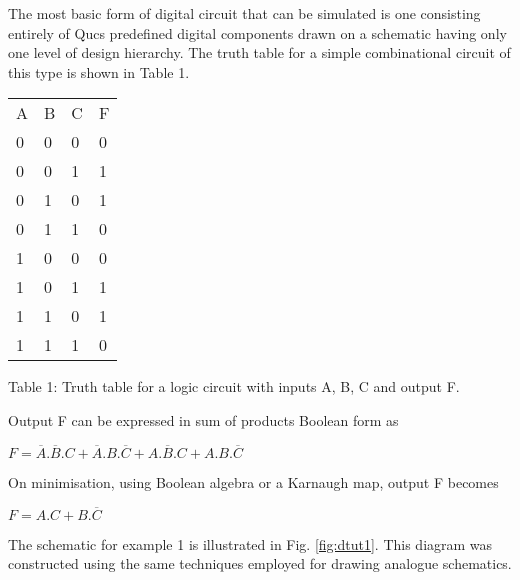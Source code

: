 The most basic form of digital circuit that can be simulated is one
consisting entirely of Qucs predefined digital components drawn on a
schematic having only one level of design hierarchy.  The truth table
for a simple combinational circuit of this type is shown in Table 1.
\begin{center}
\begin{tabular}{llll}
A & B & C & F \\ 
0 & 0 & 0 & 0 \\ 
0 & 0 & 1 & 1 \\ 
0 & 1 & 0 & 1 \\ 
0 & 1 & 1 & 0 \\ 
1 & 0 & 0 & 0 \\ 
1 & 0 & 1 & 1 \\ 
1 & 1 & 0 & 1 \\ 
1 & 1 & 1 & 0
\end{tabular}

\end{center}
\begin{flushleft}\hspace{8mm}Table 1: Truth table for a logic circuit
 with inputs A, B, C and output F.

\end{flushleft}

\begin{flushleft}
Output F can be expressed in sum of products Boolean form as
\end{flushleft}
\begin{center}
\begin{large}

$F = \overline{A}.\overline{B}.C + \overline{A}.B.\overline{C}+A.\overline{B}.C+A.B.\overline{C}$\end{large}
\end{center}

\begin{flushleft}
On minimisation, using Boolean algebra or a Karnaugh map, output F becomes
\end{flushleft}
\begin{center}
\begin{large}$F=A.C+B.\overline{C}$\end{large}
\end{center}
The schematic for example 1 is illustrated in Fig. \ref{fig:dtut1}.
This diagram was constructed using the same techniques employed for
drawing analogue schematics.


